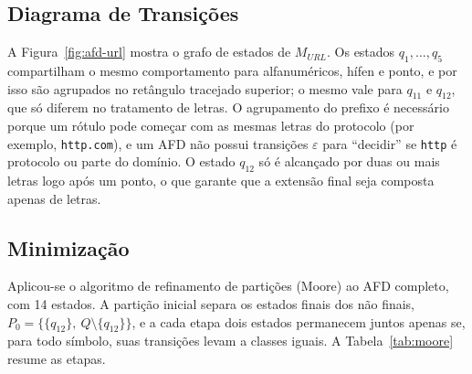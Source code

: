 \documentclass[12pt]{article}
\begin{document}
\subsection{Diagrama de Transições}
A Figura~\ref{fig:afd-url} mostra o grafo de estados de $M_{URL}$. Os estados
$q_1,\dots,q_5$ compartilham o mesmo comportamento para alfanuméricos, hífen e
ponto, e por isso são agrupados no retângulo tracejado superior; o mesmo vale
para $q_{11}$ e $q_{12}$, que só diferem no tratamento de letras. O agrupamento
do prefixo é necessário porque um rótulo pode começar com as mesmas letras do
protocolo (por exemplo, \texttt{http.com}), e um AFD não possui transições
$\varepsilon$ para ``decidir'' se \texttt{http} é protocolo ou parte do domínio.
O estado $q_{12}$ só é alcançado por duas ou mais letras logo após um ponto, o
que garante que a extensão final seja composta apenas de letras.



\subsection{Minimização}
Aplicou-se o algoritmo de refinamento de partições (Moore) ao AFD completo,
com 14 estados. A partição inicial separa os estados finais dos não finais,
$P_0 = \{\{q_{12}\},\ Q \setminus \{q_{12}\}\}$, e a cada etapa dois estados
permanecem juntos apenas se, para todo símbolo, suas transições levam a
classes iguais. A Tabela~\ref{tab:moore} resume as etapas.
\end{document}
